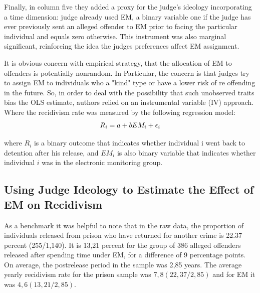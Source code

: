 \documentclass[a4paper,12pt]{article}
\begin{document}
Finally, in column five they added a proxy for the judge's ideology incorporating a time dimension: judge already used EM, a binary variable one if the judge has ever previously sent an alleged offender to EM prior to facing the particular individual and equals zero otherwise. This instrument was also marginal significant, reinforcing the idea the judges preferences affect EM assignment.  

It is obvious concern with empirical strategy, that the allocation of EM to offenders is potentially nonrandom. In Particular, the concern is that judges try to assign EM to individuals who a "kind" type or have a lower risk of re offending in the future. So, in order to deal with the possibility that such unobserved traits bias the OLS estimate, authors relied on an instrumental variable (IV) approach. Where the recidivism rate was measured by the following regression model: 
\begin{equation}
    \centering
    R_i = a + bEM_i + \epsilon_i  
\end{equation}

where $R_i$ is a binary outcome that indicates whether individual i went back to detention after his release, and $EM_i$ is also binary variable that indicates whether individual $i$ was in the electronic monitoring group. 


\subsection{Using Judge Ideology to Estimate the Effect of EM on Recidivism}
As a benchmark it was helpful to note that in the raw data, the proportion of individuals released from prison who have returned for another crime is 22.37 percent (255/1,140). It is 13,21 percent for the group of 386 alleged offenders released after spending time under EM, for a difference of 9 percentage points. On average, the postrelease period in the sample was 2,85 years. The average yearly recidivism rate for the prison sample was $7,8 (22,37/2,85)$ and for EM it was $4,6 (13,21/2,85)$. 
\end{document}
